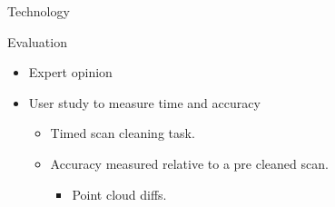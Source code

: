 \documentclass{beamer}
\begin{document}
\begin{frame}{Technology}

\end{frame}

\begin{frame}{Evaluation}
	\begin{itemize}
	\item Expert opinion
	\item User study to measure time and accuracy
	\begin{itemize}
	\item Timed scan cleaning task.
	\item Accuracy measured relative to a pre cleaned scan.
	\begin{itemize}
	\item Point cloud diffs.
	\end{itemize}
	\end{itemize}
	\end{itemize}

\end{frame}
\end{document}
